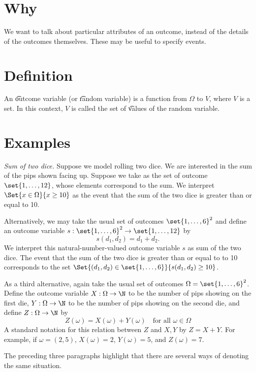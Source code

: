 
\section*{Why}

We want to talk about particular attributes of an outcome, instead of the details of the outcomes themselves.
These may be useful to specify events.

\section*{Definition}

An \t{outcome variable} (or \t{random variable}) is a function from $\Omega $ to $V$, where $V$ is a set.
In this context, $V$ is called the set of \t{values} of the random variable.

\section*{Examples}

\textit{Sum of two dice.}
Suppose we model rolling two dice.
We are interested in the sum of the pips shown facing up.
Suppose we take as the set of outcome $\set{1, \dots , 12}$, whose elements correspond to the sum.
We interpret $\Set{x \in \Omega }{x \geq 10}$ as the event that the sum of the two dice is greater than or equal to 10.

Alternatively, we may take the usual set of outcomes $\set{1, \dots , 6}^2$ and define an outcome variable $s: \set{1, \dots , 6}^2 \to \set{1, \dots , 12}$ by
\[
s(d_1, d_2) = d_1 + d_2.
\]
We interpret this natural-number-valued outcome variable $s$ as sum of the two dice.
The event that the sum of the two dice is greater than or equal to to 10 corresponds to the set $\Set{(d_1, d_2) \in \set{1, \dots , 6}}{s(d_1, d_2) \geq 10}$.


As a third alternative, again take the usual set of outcomes $\Omega  = \set{1, \dots , 6}^2$.
Define the outcome variable $X: \Omega  \to \N  $ to be the number of pips showing on the first die, $Y: \Omega  \to \N  $ to be the number of pips showing on the second die, and define $Z: \Omega  \to \N  $ by
\[
Z(\omega ) = X(\omega ) + Y(\omega ) \quad \text{for all } \omega  \in \Omega
\]
A standard notation for this relation between $Z$ and $X,Y$ by $Z = X + Y$.
For example, if $\omega  = (2,5)$, $X(\omega ) = 2$, $Y(\omega ) = 5$, and $Z(\omega ) = 7$.

The preceding three paragraphs highlight that there are several ways of denoting the same situation.

